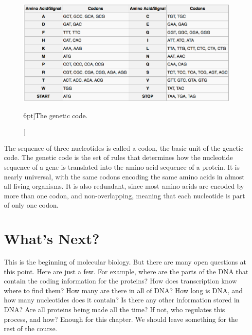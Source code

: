\begin{figure}
    \includegraphics{figs/molbiol/code-of-life.png}
    \caption[][6pt]{The genetic code.}
    \label{fig:code-of-life}
\end{figure}

The sequence of three nucleotides is called a codon, the basic unit of the genetic code. The genetic code is the set of rules that determines how the nucleotide sequence of a gene is translated into the amino acid sequence of a protein. It is nearly universal, with the same codons encoding the same amino acids in almost all living organisms. It is also redundant, since most amino acids are encoded by more than one codon, and non-overlapping, meaning that each nucleotide is part of only one codon.

\section{What's Next?}

This is the beginning of molecular biology. But there are many open questions at this point. Here are just a few. For example, where are the parts of the DNA that contain the coding information for the proteins? How does transcription know where to find them? How many are there in all of DNA? How long is DNA, and how many nucleotides does it contain? Is there any other information stored in DNA? Are all proteins being made all the time? If not, who regulates this process, and how? Enough for this chapter. We should leave something for the rest of the course.